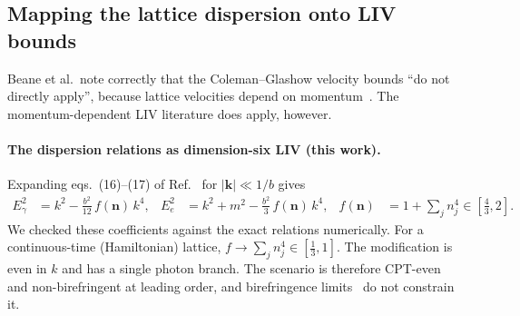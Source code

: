 \subsection{Mapping the lattice dispersion onto LIV bounds}
\label{sec:lattice-liv:mapping}

Beane et al.\ note correctly that the Coleman--Glashow velocity bounds ``do not directly apply'', because lattice velocities depend on momentum~\cite[Sec.~IV]{Beane2014constraints}. The momentum-dependent LIV literature does apply, however.

\paragraph{The dispersion relations as dimension-six LIV (this work).}
Expanding eqs.~(16)--(17) of Ref.~\cite{Beane2014constraints} for $|\mathbf k|\ll1/b$ gives
\begin{align}
E_\gamma^2 &= k^2-\tfrac{b^2}{12}\,f(\mathbf n)\,k^4, &
E_e^2 &= k^2+m^2-\tfrac{b^2}{3}\,f(\mathbf n)\,k^4, &
f(\mathbf n)&=1+\textstyle\sum_j n_j^4\in[\tfrac43,2].
\label{eq:lattice-liv:mdr}
\end{align}
We checked these coefficients against the exact relations numerically. For a continuous-time (Hamiltonian) lattice, $f\to\sum_j n_j^4\in[\frac13,1]$. The modification is even in $k$ and has a single photon branch. The scenario is therefore CPT-even and non-birefringent at leading order, and birefringence limits~\cite{Gotz2014grb,Kostelecky2013constraints} do not constrain it.

